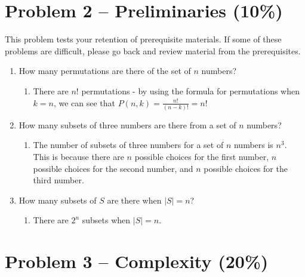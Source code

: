 \documentclass[12pt,letterpaper]{article}
\begin{document}
\newpage

\section*{Problem 2 -- Preliminaries (10\%)}
This problem tests your retention of prerequisite materials.
If some of these problems are difficult, please go back and review material from the prerequisites.
\begin{enumerate}
    \item How many permutations are there of the set of $n$ numbers?
    \begin{enumerate}
        \item There are $n!$ permutations - by using the formula for permutations when $k = n$, we can see that $P(n, k) = \frac{n!}{(n-k)!} = n!$
    \end{enumerate}
    \item How many subsets of three numbers are there from a set of $n$ numbers?
    \begin{enumerate}
        \item The number of subsets of three numbers for a set of $n$ numbers is $n^3$. This is because there are $n$ possible choices for the first number, $n$ possible choices for the second number, and $n$ possible choices for the third number.
    \end{enumerate}
    \item How many subsets of $S$ are there when $|S|=n$?
    \begin{enumerate}
        \item There are $2^n$ subsets when $|S|=n$.
    \end{enumerate}
\end{enumerate}

\newpage

\section*{Problem 3 -- Complexity (20\%)}
\end{document}
